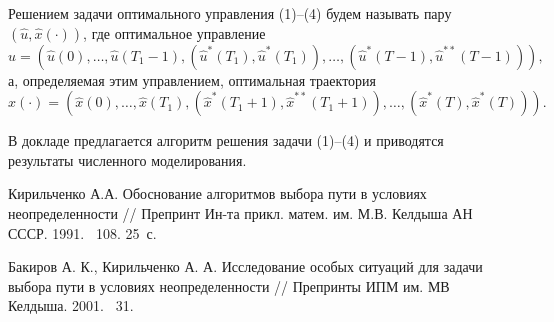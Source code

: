 Решением задачи оптимального управления (1)--(4) будем называть пару $(\hat{u}, \hat{x}(\cdot))$, где
оптимальное управление
$$
\hat{u}=(\hat{u}(0),\ldots ,\hat{u}({{T}_{1}}-1),({{{\hat{u}}}^{*}}({{T}_{1}}),{{{\hat{u}}}^{*}}({{T}_{1}})),\ldots ,({{{\hat{u}}}^{*}}(T-1),{{{\hat{u}}}^{**}}(T-1))),
$$
а, определяемая этим управлением, оптимальная траектория
$$
\hat{x}(\cdot)=(\hat{x}(0),\ldots ,\hat{x}({{T}_{1}}),({{{\hat{x}}}^{*}}({{T}_{1}}+1),{{{\hat{x}}}^{**}}({{T}_{1}}+1)),\ldots ,({{{\hat{x}}}^{*}}(T),{{{\hat{x}}}^{*}}(T))).
$$

В докладе предлагается алгоритм решения задачи (1)--(4) и приводятся результаты численного моделирования.


\setcounter{equation}{0}
\setcounter{figure}{0}



\begin{thebibliography}{9} %
 Кирильченко А.А. Обоснование алгоритмов выбора пути в условиях неопределенности  // Препринт Ин-та прикл. матем. им. М.В. Келдыша АН СССР. 1991. \textnumero~108. 25~с.

 Бакиров А. К., Кирильченко А. А. Исследование особых ситуаций для задачи выбора пути в условиях неопределенности // Препринты ИПМ им. МВ Келдыша.  2001.   \textnumero~31.

\end{thebibliography}





%
